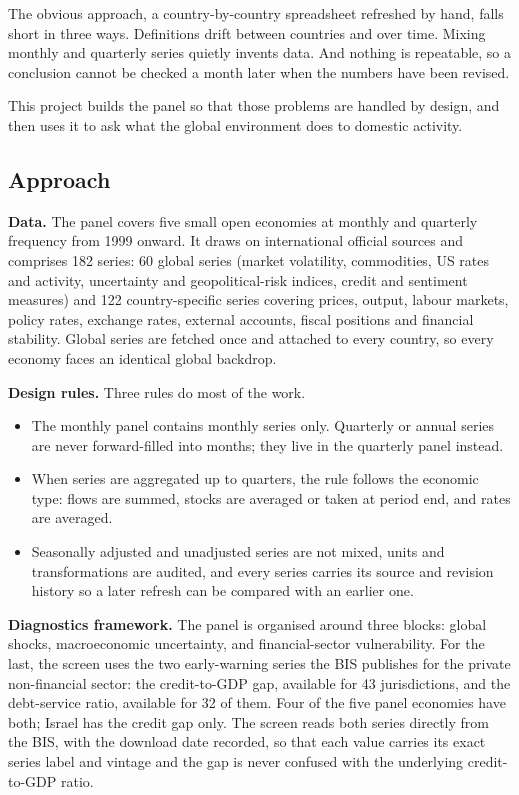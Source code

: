 \documentclass[
  british,
  a4paper,
]{article}
\providecommand{\tightlist}{%
  \setlength{\itemsep}{0pt}\setlength{\parskip}{0pt}}
\begin{document}
The obvious approach, a country-by-country spreadsheet refreshed by
hand, falls short in three ways. Definitions drift between countries and
over time. Mixing monthly and quarterly series quietly invents data. And
nothing is repeatable, so a conclusion cannot be checked a month later
when the numbers have been revised.

This project builds the panel so that those problems are handled by
design, and then uses it to ask what the global environment does to
domestic activity.

\subsection{Approach}\label{approach}

\textbf{Data.} The panel covers five small open economies at monthly and
quarterly frequency from 1999 onward. It draws on international official
sources and comprises 182 series: 60 global series (market volatility,
commodities, US rates and activity, uncertainty and geopolitical-risk
indices, credit and sentiment measures) and 122 country-specific series
covering prices, output, labour markets, policy rates, exchange rates,
external accounts, fiscal positions and financial stability. Global
series are fetched once and attached to every country, so every economy
faces an identical global backdrop.

\textbf{Design rules.} Three rules do most of the work.

\begin{itemize}
\tightlist
\item
  The monthly panel contains monthly series only. Quarterly or annual
  series are never forward-filled into months; they live in the
  quarterly panel instead.
\item
  When series are aggregated up to quarters, the rule follows the
  economic type: flows are summed, stocks are averaged or taken at
  period end, and rates are averaged.
\item
  Seasonally adjusted and unadjusted series are not mixed, units and
  transformations are audited, and every series carries its source and
  revision history so a later refresh can be compared with an earlier
  one.
\end{itemize}

\textbf{Diagnostics framework.} The panel is organised around three
blocks: global shocks, macroeconomic uncertainty, and financial-sector
vulnerability. For the last, the screen uses the two early-warning
series the BIS publishes for the private non-financial sector: the
credit-to-GDP gap, available for 43 jurisdictions, and the debt-service
ratio, available for 32 of them. Four of the five panel economies have
both; Israel has the credit gap only. The screen reads both series
directly from the BIS, with the download date recorded, so that each
value carries its exact series label and vintage and the gap is never
confused with the underlying credit-to-GDP ratio.
\end{document}
